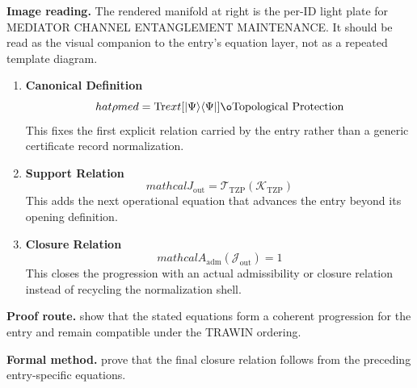 \begin{samepage}
\noindent\begin{minipage}[t]{0.45\linewidth}
\vspace{0pt}
\raggedright
\scriptsize\textbf{Image reading.} The rendered manifold at right is the per-ID light plate for MEDIATOR CHANNEL ENTANGLEMENT MAINTENANCE. It should be read as the visual companion to the entry's equation layer, not as a repeated template diagram.\par
\end{minipage}\hfill
\begin{minipage}[t]{0.53\linewidth}
\vspace*{-0.10in}
\raggedright
{}
\end{minipage}
\end{samepage}

\clearpage


\begin{enumerate}[leftmargin=1.6em,itemsep=9pt,topsep=6pt]
\item \textbf{Canonical Definition}
\[
hat{\rho} {med} = \text{Tr} {ext}[\lvert \Psi \rangle \langle \Psi|] \o\text{Topological Protection}
\]
This fixes the first explicit relation carried by the entry rather than a generic certificate record normalization.

\item \textbf{Support Relation}
\[
mathcal{J}_{\mathrm{out}} = \mathcal{T}_{\mathrm{TZP}}\!\left(\mathcal{K}_{\mathrm{TZP}}\right)
\]
This adds the next operational equation that advances the entry beyond its opening definition.

\item \textbf{Closure Relation}
\[
mathcal{A}_{\mathrm{adm}}\!\left(\mathcal{J}_{\mathrm{out}}\right)=1
\]
This closes the progression with an actual admissibility or closure relation instead of recycling the normalization shell.
\end{enumerate}

\textbf{Proof route.} show that the stated equations form a coherent progression for the entry and remain compatible under the TRAWIN ordering.

\textbf{Formal method.} prove that the final closure relation follows from the preceding entry-specific equations.

